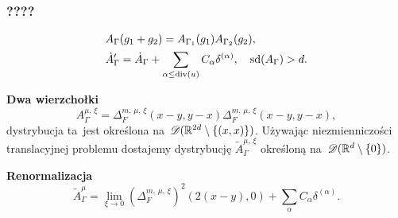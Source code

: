 \documentclass[10pt,t]{beamer}
\begin{document}
\begin{frame}
  \frametitle{????}


  \begin{subequations}
    \begin{align}
      \label{eq:Epstein-Glaser-24-A}
      &A_{ \Gamma }( g _{ 1 } + g_{ 2 } ) =
        A_{ \Gamma_{ 1 } }( g _{ 1 } ) A_{ \Gamma_{ 2 } }( g_{ 2 } ), \\
      \label{eq:Epstein-Glaser-24-B}
      &\dot{ A }_{ \Gamma }' =
        \dot{ A }_{ \Gamma }
        + \sum\limits_{ \alpha \leq \textrm{div}( u ) } C_{ \alpha } \delta^{ ( \alpha ) }, \quad
        \operatorname{sd}( A_{ \Gamma } ) > d.
    \end{align}
  \end{subequations}

  \textbf{Dwa wierzchołki}
  \begin{equation}
    \label{eq:Epstein-Glaser-25}
    A_{ \Gamma }^{ \mu,\, \xi } =
    \Delta_{ F }^{ m,\, \mu,\, \xi }( x - y, y - x ) \Delta_{ F }^{ m,\, \mu,\, \xi }( x - y, y - x ),
  \end{equation}
  dystrybucja ta~jest określona
  na~$\mathcal{D}( \mathbb{R}^{ 2 d } \setminus \{ ( x, x ) \} )$. Używając
  niezmienniczości translacyjnej problemu dostajemy dystrybucję
  $\widetilde{ A }_{ \Gamma }^{ \mu,\, \xi }$ określoną
  na~$\mathcal{D}( \mathbb{R}^{ d } \setminus \{ 0 \} )$.

  \textbf{Renormalizacja}
  \begin{equation}
    \label{eq:Epstein-Glaser-26}
    \widetilde{ A }_{ \Gamma }^{ \mu } =
    \lim\limits_{ \xi \to 0 } ( \Delta_{ F }^{ m,\, \mu,\, \xi } )^{ 2 } ( 2 ( x - y ), 0 )
    + \sum_{ \alpha } C_{ \alpha } \delta^{ ( \alpha ) }.
  \end{equation}

\end{frame}







\end{document}
